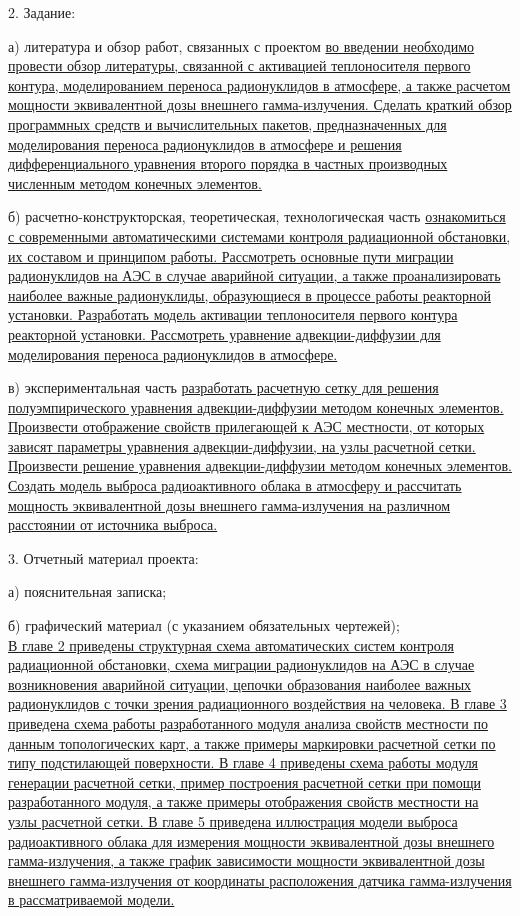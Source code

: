 2. Задание:

\hspace{1cm} а) литература и обзор работ, связанных с проектом \ul{во введении необходимо провести обзор литературы, связанной с 
активацией теплоносителя первого контура, моделированием переноса радионуклидов в атмосфере, а также расчетом мощности 
эквивалентной дозы внешнего гамма-излучения. Сделать краткий обзор программных средств и вычислительных пакетов, предназначенных 
для моделирования переноса радионуклидов в атмосфере и решения дифференциального уравнения второго порядка в частных производных 
численным методом конечных элементов.}

\hspace{1cm} б) расчетно-конструкторская, теоретическая, технологическая часть \ul{ознакомиться с современными 
автоматическими системами контроля радиационной обстановки, их составом и принципом работы. Рассмотреть основные пути 
миграции радионуклидов на АЭС в случае аварийной ситуации, а также проанализировать наиболее важные радионуклиды,
образующиеся в процессе работы реакторной установки. Разработать модель активации теплоносителя первого контура 
реакторной установки. Рассмотреть уравнение адвекции-диффузии для моделирования переноса радионуклидов в атмосфере.}

\hspace{1cm} в) экспериментальная часть \ul{разработать расчетную сетку для решения полуэмпирического уравнения 
адвекции-диффузии методом конечных элементов. Произвести отображение свойств прилегающей к АЭС местности, от которых 
зависят параметры уравнения адвекции-диффузии, на узлы расчетной сетки. Произвести решение уравнения адвекции-диффузии 
методом конечных элементов. Создать модель выброса радиоактивного облака в атмосферу и рассчитать мощность эквивалентной 
дозы внешнего гамма-излучения на различном расстоянии от источника выброса.}

3. Отчетный материал проекта:

\hspace{1cm} а) пояснительная записка;

\hspace{1cm} б) графический материал (с указанием обязательных чертежей); \\
\ul{В главе 2 приведены структурная схема автоматических систем контроля радиационной обстановки, схема миграции 
радионуклидов на АЭС в случае возникновения аварийной ситуации, цепочки образования наиболее важных радионуклидов с 
точки зрения радиационного воздействия на человека. В главе 3 приведена схема работы разработанного модуля анализа 
свойств местности по данным топологических карт, а также примеры маркировки расчетной сетки по типу подстилающей 
поверхности. В главе 4 приведены схема работы модуля генерации расчетной сетки, пример построения расчетной 
сетки при помощи разработанного модуля, а также примеры отображения свойств местности на узлы расчетной сетки. В главе 
5 приведена иллюстрация модели выброса радиоактивного облака для измерения мощности эквивалентной дозы внешнего гамма-излучения, 
а также график зависимости мощности эквивалентной дозы внешнего гамма-излучения от координаты расположения датчика 
гамма-излучения в рассматриваемой модели.}

